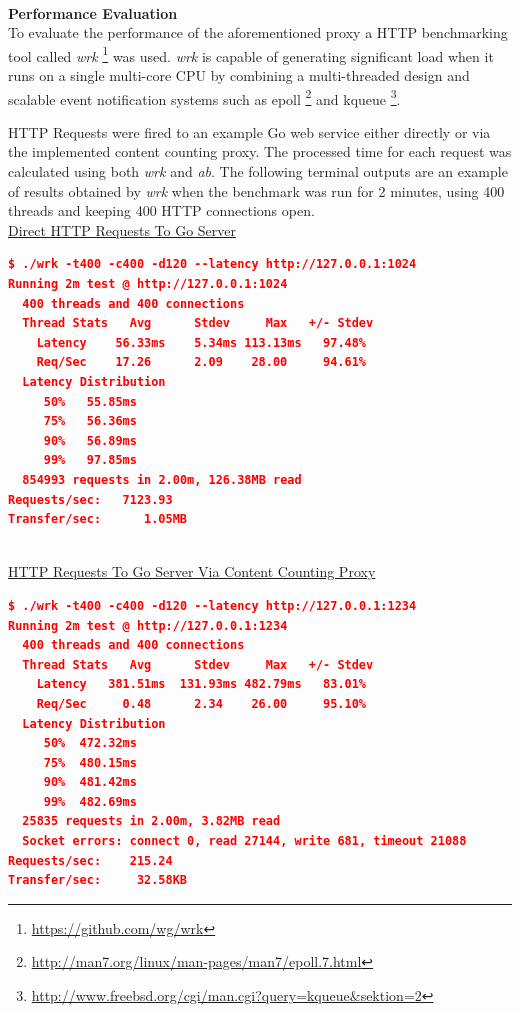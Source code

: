 \documentclass[a4paper,11pt,twoside]{article}
\begin{document}
\noindent\\
\textbf{Performance Evaluation}\\
To evaluate the performance of the aforementioned proxy a HTTP benchmarking tool called \textit{wrk} \footnote{\label{wrk} \url{https://github.com/wg/wrk}} was used. \textit{wrk} is capable of generating significant load when it runs on a single multi-core CPU by combining a multi-threaded design and scalable event notification systems such as epoll \footnote{\label{epoll} \url{http://man7.org/linux/man-pages/man7/epoll.7.html}} and kqueue \footnote{\label{kqueue} \url{http://www.freebsd.org/cgi/man.cgi?query=kqueue&sektion=2}}.



HTTP Requests were fired to an example Go web service either directly or via the implemented content counting proxy. The processed time for each request was calculated using both \textit{wrk} and \textit{ab}. The following terminal outputs are an example of results obtained by \textit{wrk} when the benchmark was run for 2 minutes, using 400 threads and keeping 400 HTTP connections open.  \\  

\noindent
\underline{Direct HTTP Requests To Go Server}
\begin{lstlisting}[language=json,firstnumber=1]
$ ./wrk -t400 -c400 -d120 --latency http://127.0.0.1:1024
Running 2m test @ http://127.0.0.1:1024
  400 threads and 400 connections
  Thread Stats   Avg      Stdev     Max   +/- Stdev
    Latency    56.33ms    5.34ms 113.13ms   97.48%
    Req/Sec    17.26      2.09    28.00     94.61%
  Latency Distribution
     50%   55.85ms
     75%   56.36ms
     90%   56.89ms
     99%   97.85ms
  854993 requests in 2.00m, 126.38MB read
Requests/sec:   7123.93
Transfer/sec:      1.05MB
\end{lstlisting}

\noindent\\
\underline{HTTP Requests To Go Server Via Content Counting Proxy} 
\begin{lstlisting}[language=json,firstnumber=1]
$ ./wrk -t400 -c400 -d120 --latency http://127.0.0.1:1234
Running 2m test @ http://127.0.0.1:1234
  400 threads and 400 connections
  Thread Stats   Avg      Stdev     Max   +/- Stdev
    Latency   381.51ms  131.93ms 482.79ms   83.01%
    Req/Sec     0.48      2.34    26.00     95.10%
  Latency Distribution
     50%  472.32ms
     75%  480.15ms
     90%  481.42ms
     99%  482.69ms
  25835 requests in 2.00m, 3.82MB read
  Socket errors: connect 0, read 27144, write 681, timeout 21088
Requests/sec:    215.24
Transfer/sec:     32.58KB
\end{lstlisting}
\end{document}
